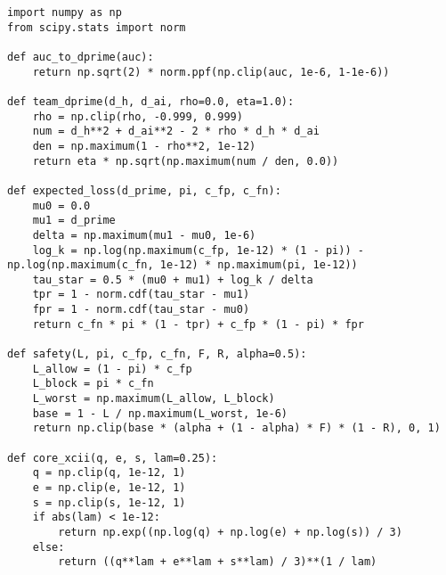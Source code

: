 \documentclass[a4paper]{article}
\begin{document}
\begin{verbatim}
import numpy as np
from scipy.stats import norm

def auc_to_dprime(auc):
    return np.sqrt(2) * norm.ppf(np.clip(auc, 1e-6, 1-1e-6))

def team_dprime(d_h, d_ai, rho=0.0, eta=1.0):
    rho = np.clip(rho, -0.999, 0.999)
    num = d_h**2 + d_ai**2 - 2 * rho * d_h * d_ai
    den = np.maximum(1 - rho**2, 1e-12)
    return eta * np.sqrt(np.maximum(num / den, 0.0))

def expected_loss(d_prime, pi, c_fp, c_fn):
    mu0 = 0.0
    mu1 = d_prime
    delta = np.maximum(mu1 - mu0, 1e-6)
    log_k = np.log(np.maximum(c_fp, 1e-12) * (1 - pi)) - np.log(np.maximum(c_fn, 1e-12) * np.maximum(pi, 1e-12))
    tau_star = 0.5 * (mu0 + mu1) + log_k / delta
    tpr = 1 - norm.cdf(tau_star - mu1)
    fpr = 1 - norm.cdf(tau_star - mu0)
    return c_fn * pi * (1 - tpr) + c_fp * (1 - pi) * fpr

def safety(L, pi, c_fp, c_fn, F, R, alpha=0.5):
    L_allow = (1 - pi) * c_fp
    L_block = pi * c_fn
    L_worst = np.maximum(L_allow, L_block)
    base = 1 - L / np.maximum(L_worst, 1e-6)
    return np.clip(base * (alpha + (1 - alpha) * F) * (1 - R), 0, 1)

def core_xcii(q, e, s, lam=0.25):
    q = np.clip(q, 1e-12, 1)
    e = np.clip(e, 1e-12, 1)
    s = np.clip(s, 1e-12, 1)
    if abs(lam) < 1e-12:
        return np.exp((np.log(q) + np.log(e) + np.log(s)) / 3)
    else:
        return ((q**lam + e**lam + s**lam) / 3)**(1 / lam)


\end{verbatim}
\end{document}
